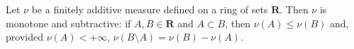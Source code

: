 Let $\nu$ be a finitely additive measure defined on a ring of sets $\mathbf{R}$. Then $\nu$ is monotone and subtractive: if $A, B \in \mathbf{R}$ and $A \subset B$, then $\nu(A) \leq \nu(B)$ and, provided $\nu(A) < +\infty$, $\nu(B \setminus A) = \nu(B) - \nu(A)$.

